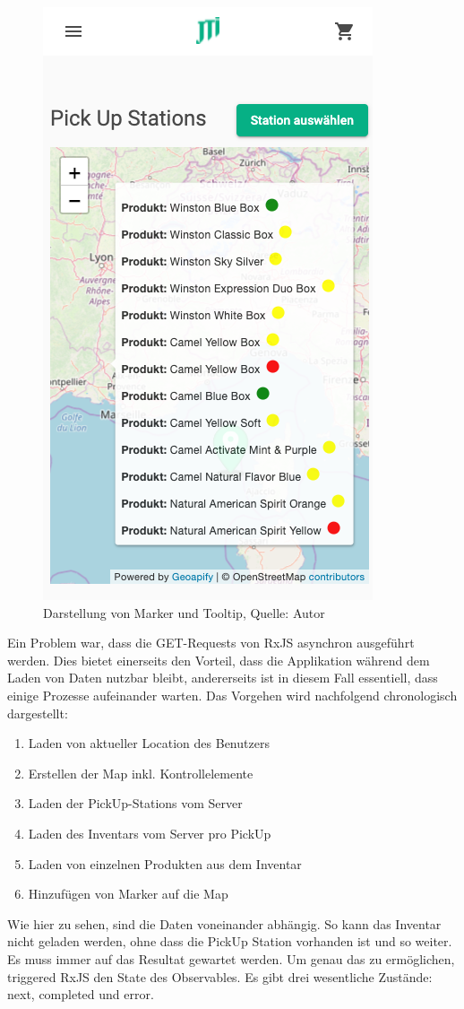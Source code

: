  \begin{figure}[H]
 	\centering
 	\includegraphics[scale=0.4]{images/tooltipCard.PNG}
 	\caption[Darstellung von Marker und Tooltip]{Darstellung von Marker und Tooltip, Quelle: Autor}
 	\label{img: tooltipCard}
 \end{figure} 
 
 Ein Problem war, dass die GET-Requests von \gls{RxJS} asynchron ausgeführt werden. Dies bietet einerseits den Vorteil, dass die Applikation während dem Laden von Daten nutzbar bleibt, andererseits ist in diesem Fall essentiell, dass einige Prozesse aufeinander warten. Das Vorgehen wird nachfolgend chronologisch dargestellt: 
 \begin{enumerate}
 	\item Laden von aktueller Location des Benutzers
 	\item Erstellen der Map inkl. Kontrollelemente
 	\item Laden der PickUp-Stations vom Server
 	\item Laden des Inventars vom Server pro PickUp
 	\item Laden von einzelnen Produkten aus dem Inventar
 	\item Hinzufügen von Marker auf die Map 
\end{enumerate}
\newpage
Wie hier zu sehen, sind die Daten voneinander abhängig. So kann das Inventar nicht geladen werden, ohne dass die PickUp Station vorhanden ist und so weiter. Es muss immer auf das Resultat gewartet werden. Um genau das zu ermöglichen, triggered RxJS den State des Observables. Es gibt drei wesentliche Zustände: next, completed und error. 

